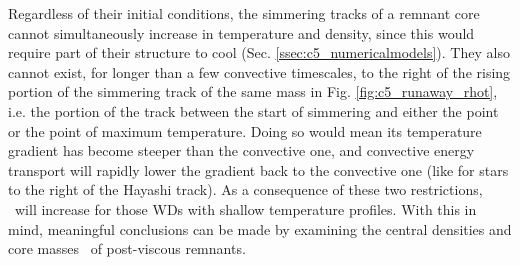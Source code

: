 Regardless of their initial conditions, the simmering tracks of a remnant core cannot simultaneously increase in temperature and density, since this would require part of their structure to cool (Sec. \ref{ssec:c5_numericalmodels}).  They also cannot exist, for longer than a few convective timescales, to the right of the rising portion of the simmering track of the same mass in Fig. \ref{fig:c5_runaway_rhot}, i.e. the portion of the track between the start of simmering and either the \citeal{wooswk04} point or the point of maximum temperature.  Doing so would mean its temperature gradient has become steeper than the convective one, and convective energy transport will rapidly lower the gradient back to the convective one (like for stars to the right of the Hayashi track).  As a consequence of these two restrictions, \Mcrit\ will increase for those WDs with shallow temperature profiles.  With this in mind, meaningful conclusions can be made by examining the central densities and core masses \Mc\ of post-viscous remnants.


